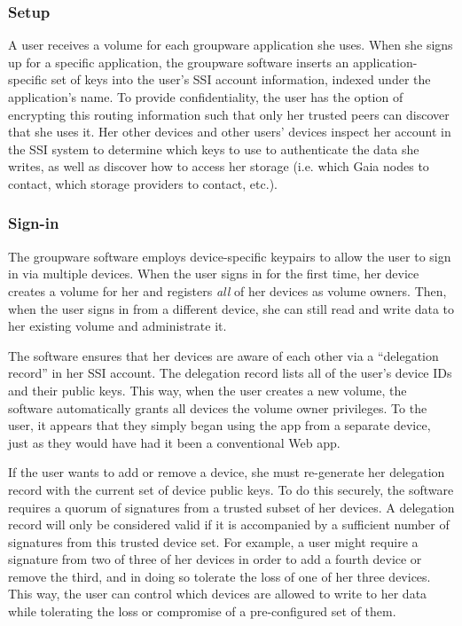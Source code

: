 \subsubsection{Setup}

A user receives a volume for each groupware application she uses.  When she signs up for a specific
application, the groupware software inserts an application-specific set of keys
into the user's SSI account information, indexed under the application's name.  To provide
confidentiality, the user has the option of encrypting this routing information
such that only her trusted peers can discover that she uses it.  Her other
devices and other users' devices inspect her account in the SSI system to determine
which keys to use to authenticate the data she writes, as well as discover how
to access her storage (i.e. which Gaia nodes to contact, which storage providers
to contact, etc.).

\subsubsection{Sign-in}

The groupware software employs device-specific keypairs to allow the user to
sign in via multiple devices.  When the user signs in for the first time, her
device creates a volume for her and registers \emph{all} of her devices as
volume owners.  Then, when the user signs in from a different device, she can
still read and write data to her existing volume and administrate it.

The software ensures that her devices are aware of each other via a
``delegation record'' in her SSI account.  The delegation record lists all of
the user's device IDs and their public keys.  This way, when the user creates a
new volume, the software automatically grants all devices the volume owner
privileges.  To the user, it appears that they simply began using the app from a
separate device, just as they would have had it been a conventional Web app.

If the user wants to add or remove a device, she must re-generate her delegation
record with the current set of device public keys.
To do this securely, the software requires a quorum of signatures from a trusted
subset of her devices.  A delegation record will only be considered valid if it
is accompanied by a sufficient number of signatures from this trusted device
set.  For example, a user might require a signature from two of three of her
devices in order to add a fourth device or remove the third, and in doing so
tolerate the loss of one of her three devices.  This way, the user can control
which devices are allowed to write to her data while tolerating the loss or
compromise of a pre-configured set of them.

